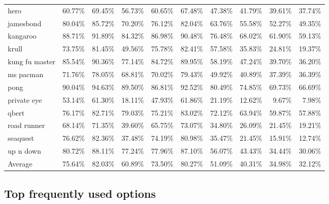 \begin{table}
{\begin{tabular}{l|rrr|rrrrrr}
        hero & 60.77\% & 69.45\% & 56.73\% & 60.65\% & 67.48\% & 47.38\% & 41.79\% & 39.61\% & 37.74\% \\
        jamesbond & 80.04\% & 85.72\% & 70.20\% & 76.12\% & 82.04\% & 63.76\% & 55.58\% & 52.27\% & 49.35\% \\
        kangaroo & 88.71\% & 91.89\% & 84.32\% & 86.98\% & 90.48\% & 76.48\% & 68.02\% & 61.90\% & 59.13\% \\
        krull & 73.75\% & 81.45\% & 49.56\% & 75.78\% & 82.41\% & 57.58\% & 35.83\% & 24.81\% & 19.37\% \\
        kung fu master & 85.54\% & 90.36\% & 77.14\% & 84.72\% & 89.95\% & 58.19\% & 47.24\% & 39.70\% & 36.20\% \\
        ms pacman & 71.76\% & 78.05\% & 68.81\% & 70.02\% & 79.43\% & 49.92\% & 40.89\% & 37.39\% & 36.39\% \\
        pong & 90.04\% & 94.63\% & 89.50\% & 86.81\% & 92.52\% & 80.49\% & 74.85\% & 69.73\% & 66.69\% \\
        private eye & 53.14\% & 61.30\% & 18.11\% & 47.93\% & 61.86\% & 21.19\% & 12.62\% & 9.67\% & 7.98\% \\
        qbert & 76.17\% & 82.71\% & 79.03\% & 75.21\% & 83.02\% & 72.12\% & 63.94\% & 59.87\% & 57.88\% \\
        road runner & 68.14\% & 71.35\% & 39.60\% & 65.75\% & 73.07\% & 34.80\% & 26.09\% & 21.45\% & 19.21\% \\
        seaquest & 76.62\% & 82.36\% & 37.48\% & 74.19\% & 80.98\% & 35.47\% & 21.45\% & 15.91\% & 12.74\% \\
        up n down & 80.72\% & 88.11\% & 77.24\% & 77.96\% & 87.10\% & 56.07\% & 43.43\% & 34.44\% & 30.06\% \\
        \midrule
        Average & 75.64\% & 82.03\% & 60.89\% & 73.50\% & 80.27\% & 51.09\% & 40.31\% & 34.98\% & 32.12\% \\
        \bottomrule
    \end{tabular}
    }
    \label{tab:option-prediction-op3-op6}
\end{table}

\clearpage


\subsection{Top frequently used options}
\label{appendix:topk-analysis}

